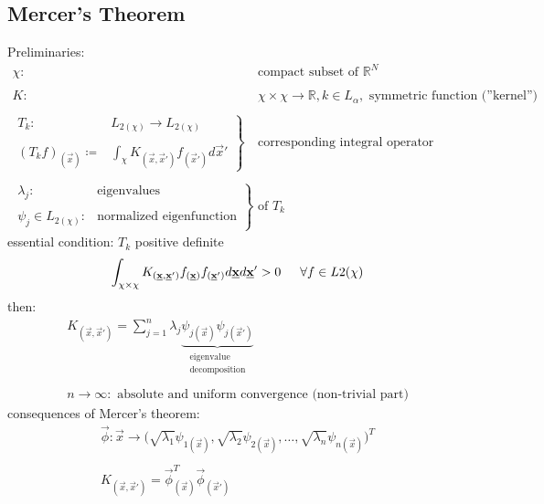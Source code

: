 \subsection{Mercer's Theorem}
Preliminaries:
\[ \begin{array}{ll}
	\chi: & \text{compact subset of } \mathbb{R}^N \\\\
	K: & \chi \times \chi \rightarrow \mathbb{R}, k \in L_\alpha,
		\text{ symmetric function (''kernel'')} \\\\
	\left. \begin{array}{ll}
	T_k: & L_{2 (\chi)} \rightarrow L_{2 (\chi)} \\\\
	(T_k f)_{(\vec{x})} \coloneqq & \int_\chi K_{(\vec{x},\vec{x}')}
		f_{(\vec{x}')} d \vec{x}'
	\end{array} \right \} & \text{corresponding integral operator} \\\\
	\left. \begin{array}{ll}
	\lambda_j: & \text{eigenvalues} \\\\
	\psi_j \in L_{2 (\chi)}:	& \text{normalized eigenfunction}
	\end{array} \right \} & \text{of } T_k
\end{array} \]
essential condition: $T_k$ positive definite
\begin{equation}
	\int_{\chi \times \chi} K_{(\vec{x}, \vec{x}')} f_{(\vec{x})}
		f_{(\vec{x}')} d \vec{x} d \vec{x}' > 0 
	\indent \forall f \in L{2 (\chi)}
\end{equation}
then:
\begin{equation}
	\begin{array}{l}
	K_{(\vec{x}, \vec{x}')} = \sum\limits_{j = 1}^n \lambda_j 
		\underbrace{ \psi_{j (\vec{x})} \psi_{j (\vec{x}')} }_{
			\substack{\text{eigenvalue} \\ \text{decomposition}}}
			\\\\
	n \rightarrow \infty: \text{ absolute and uniform convergence 
		(non-trivial part)}
	\end{array}
\end{equation}
consequences of Mercer's theorem:
\begin{equation}
	\begin{array}{l}
	\vec{\phi}: \vec{x} \rightarrow 
		\big( \sqrt{\lambda_1} \psi_{1(\vec{x})},
		\sqrt{\lambda_2} \psi_{2(\vec{x})}, \ldots,
		\sqrt{\lambda_n} \psi_{n(\vec{x})}
		\big)^T \\\\
	K_{(\vec{x}, \vec{x}')} = \vec{\phi}_{(\vec{x})}^T 
		\vec{\phi}_{(\vec{x}')}
	\end{array}
\end{equation}
